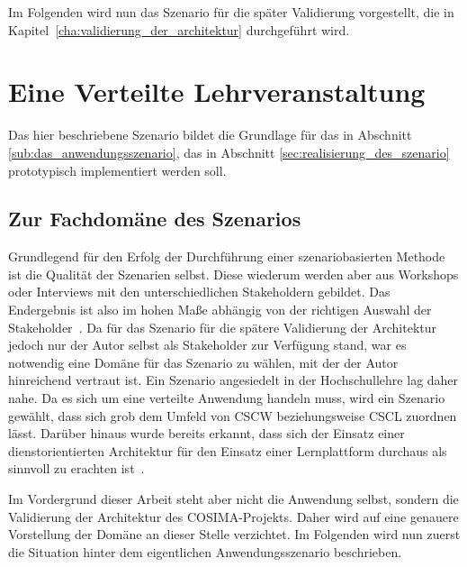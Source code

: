   
  Im Folgenden wird nun das Szenario für die später Validierung vorgestellt, die in Kapitel~\ref{cha:validierung_der_architektur} durchgeführt wird.
  

\section{Eine Verteilte Lehrveranstaltung} %
\label{sec:hochschulszenario}

  Das hier beschriebene Szenario bildet die Grundlage für das in Abschnitt \ref{sub:das_anwendungsszenario}, das in Abschnitt \ref{sec:realisierung_des_szenario} prototypisch implementiert werden soll.

\subsection{Zur Fachdomäne des Szenarios} %
\label{sub:zur_fachdomaene_des_szenarios}

  Grundlegend für den Erfolg der Durchführung einer szenariobasierten Methode ist die Qualität der Szenarien selbst. Diese wiederum werden aber aus Workshops oder Interviews mit den unterschiedlichen Stakeholdern gebildet. Das Endergebnis ist also im hohen Maße abhängig von der richtigen Auswahl der Stakeholder~\citep[S. 187]{evaluating_software_architectures}. Da für das Szenario für die spätere Validierung der Architektur jedoch nur der Autor selbst als Stakeholder zur Verfügung stand, war es notwendig eine Domäne für das Szenario zu wählen, mit der der Autor hinreichend vertraut ist. Ein Szenario angesiedelt in der Hochschullehre lag daher nahe. Da es sich um eine verteilte Anwendung handeln muss, wird ein Szenario gewählt, dass sich grob dem Umfeld von CSCW beziehungsweise CSCL zuordnen lässt. Darüber hinaus wurde bereits erkannt, dass sich der Einsatz einer dienstorientierten Architektur für den Einsatz einer Lernplattform durchaus als sinnvoll zu erachten ist~\citep{campus_source}.
  
  Im Vordergrund dieser Arbeit steht aber nicht die Anwendung selbst, sondern die Validierung der Architektur des COSIMA-Projekts. Daher wird auf eine genauere Vorstellung der Domäne an dieser Stelle verzichtet. Im Folgenden wird nun zuerst die Situation hinter dem eigentlichen Anwendungsszenario beschrieben.


